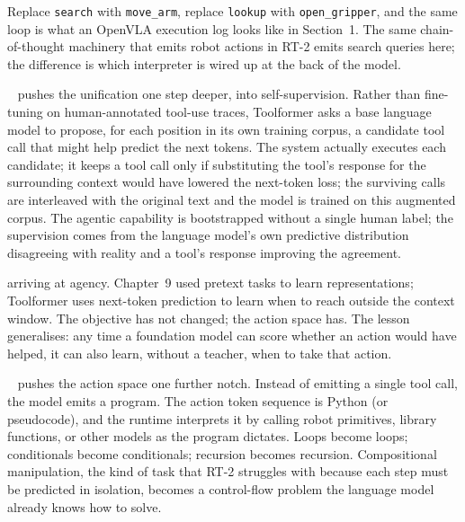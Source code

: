  Replace \texttt{search} with \texttt{move\_arm}, replace \texttt{lookup} with \texttt{open\_gripper}, and the same loop is what an OpenVLA execution log looks like in Section~1. The same chain-of-thought machinery that emits robot actions in RT-2 emits search queries here; the difference is which interpreter is wired up at the back of the model.

~\cite{Schick2023Toolformer} pushes the unification one step deeper, into self-supervision. Rather than fine-tuning on human-annotated tool-use traces, Toolformer asks a base language model to propose, for each position in its own training corpus, a candidate tool call that might help predict the next tokens. The system actually executes each candidate; it keeps a tool call only if substituting the tool's response for the surrounding context would have lowered the next-token loss; the surviving calls are interleaved with the original text and the model is trained on this augmented corpus. The agentic capability is bootstrapped without a single human label; the supervision comes from the language model's own predictive distribution disagreeing with reality and a tool's response improving the agreement.


 arriving at agency. Chapter~9 used pretext tasks to learn representations; Toolformer uses next-token prediction to learn when to reach outside the context window. The objective has not changed; the action space has. The lesson generalises: any time a foundation model can score whether an action would have helped, it can also learn, without a teacher, when to take that action.

~\cite{Liang2023CodeAsPolicies} pushes the action space one further notch. Instead of emitting a single tool call, the model emits a program. The action token sequence is Python (or pseudocode), and the runtime interprets it by calling robot primitives, library functions, or other models as the program dictates. Loops become loops; conditionals become conditionals; recursion becomes recursion. Compositional manipulation, the kind of task that RT-2 struggles with because each step must be predicted in isolation, becomes a control-flow problem the language model already knows how to solve.

